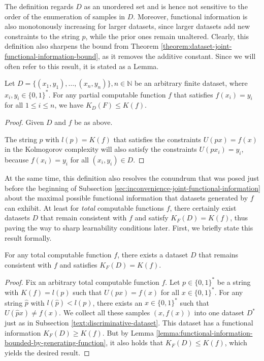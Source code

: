 The definition regards $D$ as an unordered set and is hence not sensitive to the order of the enumeration of samples in $D$.
Moreover, functional information is also monotonously increasing for larger datasets, since larger datasets add new constraints to the string $p$, while the prior ones remain unaltered.
Clearly, this definition also sharpens the bound from Theorem \ref{theorem:dataset-joint-functional-information-bound}, as it removes the additive constant. Since we will often refer to this result, it is stated as a Lemma.
\begin{lemma}
	\label{lemma:functional-information-bounded-by-generating-function}
	Let $D=\{(x_1,y_1),\dots,(x_n,y_n)\},n\in\mathbb{N}$ be an arbitrary finite dataset, where $x_i,y_i\in\{0,1\}^{*}$.
	For any partial computable function $f$ that satisfies $f(x_i)=y_i$ for all $1\leq i\leq n$, we have $K_D(F)\leq K(f)$.
\end{lemma}
\begin{proof}
	Given $D$ and $f$ be as above.
	
	The string $p$ with $l(p)=K(f)$ that satisfies the constraints $U(px)=f(x)$ in the Kolmogorov complexity will also satisfy the constraints $U(px_i)=y_i$, because $f(x_i)=y_i$ for all $(x_i,y_i)\in D$.
\end{proof}
At the same time, this definition also resolves the conundrum that was posed just before the beginning of Subsection \ref{sec:inconvenience-joint-functional-information} about the maximal possible functional information that datasets generated by $f$ can exhibit.
At least for \textit{total} computable functions $f$, there certainly exist datasets $D$ that remain consistent with $f$ and satisfy $K_F(D)=K(f)$, thus paving the way to sharp learnability conditions later.
First, we briefly state this result formally.
\begin{lemma}
	\label{lemma:maximal-function-information}
	For any total computable function $f$, there exists a dataset $D$ that remains consistent with $f$ and satisfies $K_F(D)=K(f)$.
\end{lemma}
\begin{proof}
	Fix an arbitrary total computable function $f$.
	Let $p\in\{0,1\}^{*}$ be a string with $K(f)=l(p)$ such that $U(px)=f(x)$ for all $x\in\{0,1\}^{*}$. 
	For any string $\hat{p}$ with $l(\hat{p})<l(p)$, there exists an $x\in\{0,1\}^{*}$ such that $U(\hat{p}x)\neq f(x)$.
	We collect all these samples $(x,f(x))$ into one dataset $D^{*}$ just as in Subsection \ref{text:discriminative-dataset}.
	This dataset has a functional information $K_F(D)\geq K(f)$.
	But by Lemma \ref{lemma:functional-information-bounded-by-generating-function}, it also holds that $K_F(D)\leq K(f)$, which yields the desired result.
\end{proof}
